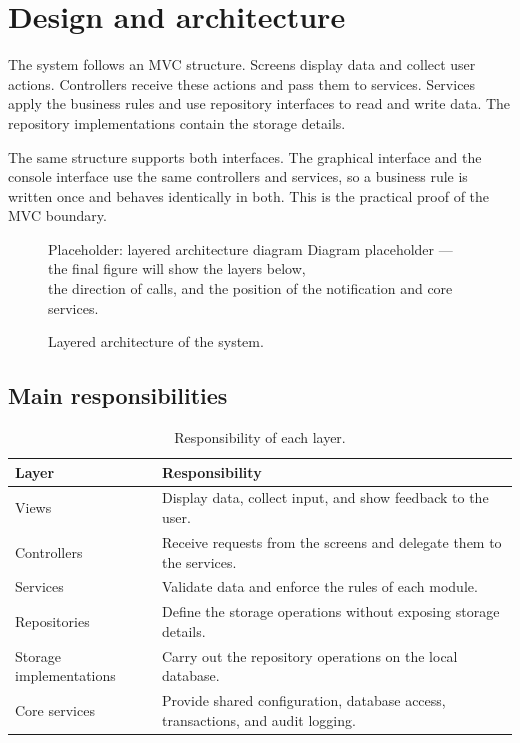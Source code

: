 \section{Design and architecture}

The system follows an MVC structure. Screens display data and collect user actions. Controllers receive these actions and pass them to services. Services apply the business rules and use repository interfaces to read and write data. The repository implementations contain the storage details.

The same structure supports both interfaces. The graphical interface and the console interface use the same controllers and services, so a business rule is written once and behaves identically in both. This is the practical proof of the MVC boundary.

\begin{figure}[H]
  \centering
  \begin{diagrambox}{Placeholder: layered architecture diagram}
    Diagram placeholder --- the final figure will show the layers below,\\
    the direction of calls, and the position of the notification and core services.
  \end{diagrambox}
  \caption{Layered architecture of the system.}
  \label{fig:architecture}
\end{figure}

\subsection{Main responsibilities}

\begin{table}[H]
\centering
\small
\begin{tabularx}{\textwidth}{@{}L{0.27\textwidth}Y@{}}
\toprule
\textbf{Layer} & \textbf{Responsibility} \\
\midrule
Views & Display data, collect input, and show feedback to the user. \\
Controllers & Receive requests from the screens and delegate them to the services. \\
Services & Validate data and enforce the rules of each module. \\
Repositories & Define the storage operations without exposing storage details. \\
Storage implementations & Carry out the repository operations on the local database. \\
Core services & Provide shared configuration, database access, transactions, and audit logging. \\
\bottomrule
\end{tabularx}
\caption{Responsibility of each layer.}
\label{tab:layers}
\end{table}

